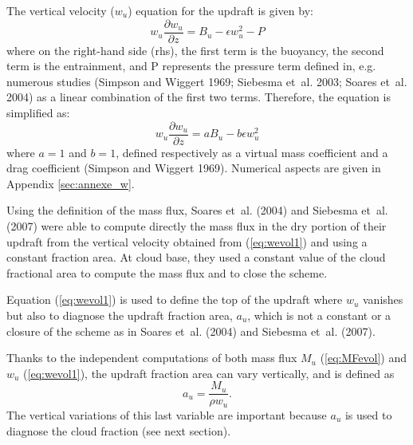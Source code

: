 The vertical velocity ($w_u$) equation for the updraft is given by:
\begin{equation}
{w_u}\frac{\partial{w_u}}{\partial{z}}=B_u-\epsilon w_u^2 -P
\label{eq:WevolwithP}
\end{equation}
where on the right-hand side (rhs), the first term is the buoyancy, the second term is the entrainment, and
P represents the pressure term defined in, e.g. numerous studies (Simpson and Wiggert 1969; Siebesma et~al. 2003; Soares et~al. 2004) as a linear combination of the first two terms. Therefore, the equation is simplified as: 
\begin{equation}
w_u\frac{\partial{w_u}}{\partial{z}}=a B_u-b \epsilon w_u^2 
\label{eq:wevol1}
\end{equation}
where $a=1$ and $b=1$, defined respectively as a virtual mass coefficient and a drag coefficient (Simpson and Wiggert 1969). Numerical aspects are given in Appendix \ref{sec:annexe_w}. 

Using the definition of the mass flux, Soares et~al. (2004) and Siebesma et~al. (2007) were able to compute directly the mass flux in the dry portion of their updraft from the vertical velocity obtained from (\ref{eq:wevol1}) and using a constant fraction area. At cloud base, they used a constant value of the cloud fractional area to compute the mass flux and to close the scheme.

Equation (\ref{eq:wevol1}) is used to define the top of the updraft where $w_{u}$ vanishes but also to diagnose the updraft fraction area, $a_u$, which is not a constant or a closure of the scheme as in Soares et~al. (2004) and Siebesma et~al. (2007). 

Thanks to the independent computations of both mass flux $M_u$ (\ref{eq:MFevol}) and $w_{u}$ (\ref{eq:wevol1}), the updraft fraction area can vary vertically, and is defined as
\begin{equation}
   a_u=\frac{M_u}{\rho w_u}.
   \label{eq:updraft_fraction}
\end{equation}
The vertical variations of this last variable are important because $a_u$ is used to diagnose the cloud fraction (see next section).

